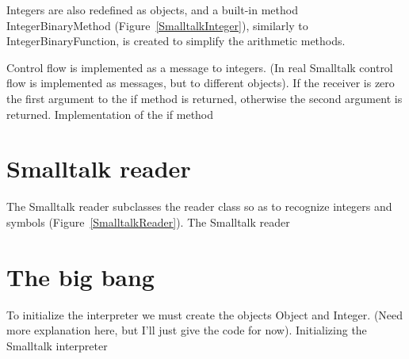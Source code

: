 Integers are also redefined as objects, and a built-in method {\sf
    IntegerBinaryMethod} (Figure~\ref{SmalltalkInteger}), similarly to {\sf
    IntegerBinaryFunction}, is created to simplify the arithmetic methods.

Control flow is implemented as a message to integers.  (In real Smalltalk
control flow is implemented as messages, but to different objects).  If the
receiver is zero the first argument to the if method is returned, otherwise the
second argument is returned.
%
{Implementation of the if method}

\section{Smalltalk reader}

The Smalltalk reader subclasses the reader class so as to recognize
integers and symbols (Figure~\ref{SmalltalkReader}).
%
{The Smalltalk reader}

\section{The big bang}

To initialize the interpreter we must create the objects {\sf Object} and {\sf
    Integer}.  (Need more explanation here, but I'll just give the code for
now).
%
{Initializing the Smalltalk interpreter}
